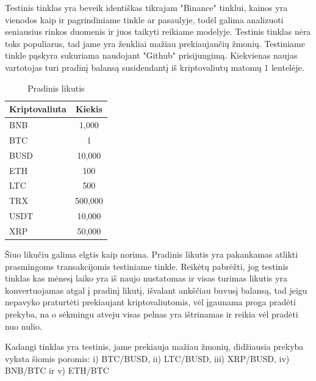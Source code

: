 \documentclass{VUMIFInfKursinis}
\begin{document}
Testinis tinklas yra beveik identiškas tikrajam "Binance" tinklui, kainos yra vienodos kaip ir pagrindiniame tinkle ar pasaulyje, todėl galima analizuoti 
seniausius rinkos duomenis ir juos taikyti reikiame modelyje. Testinis tinklas nėra toks populiarus, tad jame yra ženkliai mažiau prekiaujančių žmonių. 
Testiniame tinkle pąskyra sukuriama naudojant "Github" prisijungimą. Kiekvienas naujas vartotojas turi pradinį balansą susidendantį iš kriptovaliutų
matomų 1 lentelėje.

\begin{table}[H]\footnotesize
  \centering
  \caption{Pradinis likutis}    %
  {\begin{tabular}{|l|c|} \hline
      Kriptovaliuta & Kiekis  \\
      \hline
      BNB           & 1,000   \\
      BTC           & 1       \\
      BUSD          & 10,000  \\
      ETH           & 100     \\
      LTC           & 500     \\
      TRX           & 500,000 \\
      USDT          & 10,000  \\
      XRP           & 50,000  \\
      \hline 
    \end{tabular}}
\end{table}

Šiuo likučiu galima elgtis kaip norima. Pradinis likutis yra pakankamas atlikti prasmingoms transakcijomis testiniame tinkle. Reikėtų pabrėžti, jog testinis
tinklas kas mėnesį laiko yra iš naujo nustatomas ir visas turimas likutis yra konvertuojamas atgal į pradinį likutį, išvalant ankščiau buvusį balansą, tad jeigu
nepavyko praturtėti prekiaujant kriptovaliutomis, vėl įgaunama proga pradėti prekyba, na o sėkmingu atveju visas pelnas yra ištrinamas ir reikia vėl pradėti
nuo nulio.

Kadangi tinklas yra testinis, jame prekiauja mažiau žmonių, didžiausia prekyba vyksta šiomis poromis: i) BTC/BUSD, ii) LTC/BUSD, iii) XRP/BUSD,
iv) BNB/BTC ir v) ETH/BTC
\end{document}
